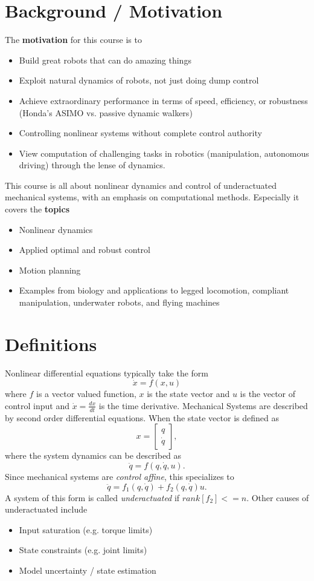 \documentclass[10pt,english, openany]{book}
\begin{document}
\section{Background / Motivation}
The \textbf{motivation} for this course is to
\begin{itemize}
\item Build great robots that can do amazing things
\item Exploit natural dynamics of robots, not just doing dump control
\item Achieve extraordinary performance in terms of speed, efficiency, or robustness (Honda's ASIMO vs. passive dynamic walkers)
\item Controlling nonlinear systems without complete control authority
\item View computation of challenging tasks in robotics (manipulation, autonomous driving) through the lense of dynamics.
\end{itemize}
This course is all about nonlinear dynamics and control of underactuated mechanical systems, with an emphasis on computational methods. Especially it covers the \textbf{topics}
\begin{itemize}
\item Nonlinear dynamics
\item Applied optimal and robust control
\item Motion planning
\item Examples from biology and applications to legged locomotion, compliant manipulation, underwater robots, and flying machines
\end{itemize}

\section{Definitions}
Nonlinear differential equations typically take the form
$$ \dot{x} = f(x,u) $$
where $f$ is a vector valued function, $x$ is the state vector and $u$ is the vector of control input and $\dot{x}=\frac{dx}{dt}$ is the time derivative.
Mechanical Systems are described by second order differential equations. When the state vector is defined as 
$$x=\begin{bmatrix}q \\ \dot{q}\end{bmatrix},$$ 
where the system dynamics can be described as
$$\ddot{q}=f(q,\dot{q}, u).$$
Since mechanical systems are \textit{control affine}, this specializes to
$$ \ddot{q}=f_{1}(q,\dot{q})+f_{2}(q,\dot{q})u.$$
A system of this form is called \textit{underactuated} if $rank[f_{2}]<=n$. 
Other causes of underactuated include
\begin{itemize}
\item Input saturation (e.g. torque limits)
\item State constraints (e.g. joint limits)
\item Model uncertainty / state estimation
\end{itemize}
 
\end{document}
